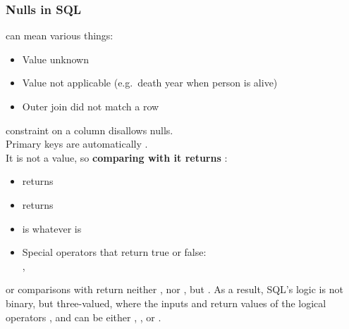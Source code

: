 \begin{frame}
    \label{s:nulls}
    \frametitle{Nulls in SQL}
     can mean various things:
    \begin{itemize}
        \item Value unknown
        \item Value not applicable (e.g.\ death year when person is alive)
        \item Outer join did not match a row
    \end{itemize}
     constraint on a column disallows nulls.\\
    Primary keys are automatically .\\[0.8em]\pause
    It is not a value, so \textbf{comparing with it returns }:
    \begin{itemize}
        \item {} returns 
        \item {} returns 
        \item {} is  whatever  is
        \item Special operators that return true or false:\\
            ,\qquad {}
    \end{itemize}
\end{frame}
\label{l:nulls}

\code{=} or \code{<>} comparisons with  return neither , nor , but .
As a result, SQL's logic is not binary, but three-valued, where the inputs and return values of the logical operators ,  and  can be either , , or .

